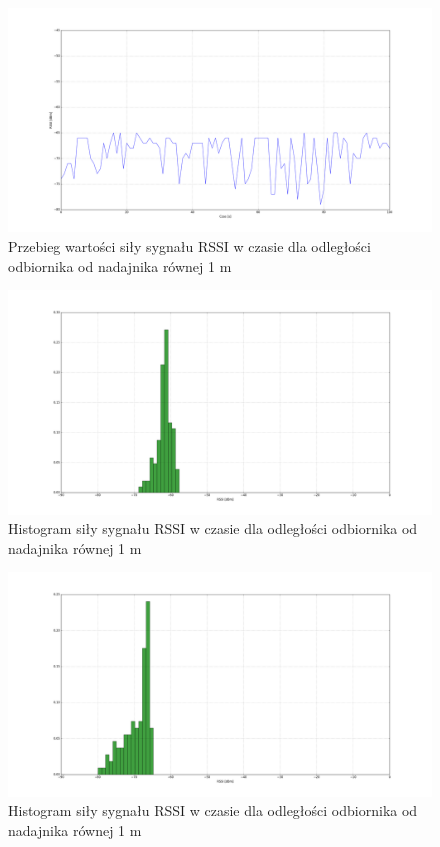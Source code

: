 \begin{figure}[H]
\centering
\includegraphics[width=1\textwidth]{img/5m.png}
\caption{Przebieg wartości siły sygnału RSSI w czasie dla odległości odbiornika od nadajnika równej 1 m}
\label{fig:rssi-5m}
\end{figure}

\begin{figure}[H]
\centering
\includegraphics[width=1\textwidth]{img/1m-hist.png}
\caption{Histogram siły sygnału RSSI w czasie dla odległości odbiornika od nadajnika równej 1 m}
\label{fig:rssi-1m-hist}
\end{figure}

\begin{figure}[H]
\centering
\includegraphics[width=1\textwidth]{img/5m-hist.png}
\caption{Histogram siły sygnału RSSI w czasie dla odległości odbiornika od nadajnika równej 1 m}
\label{fig:rssi-5m-hist}
\end{figure}


